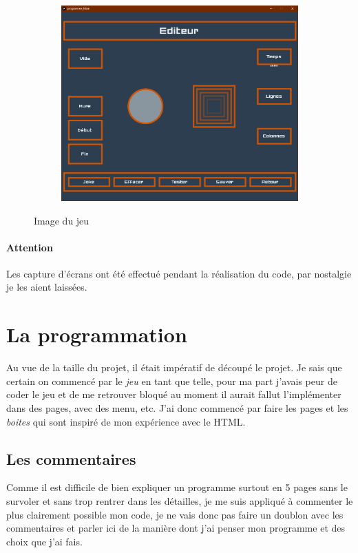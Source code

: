 \documentclass[10pt,a4paper]{article}
\begin{document}
\begin{figure}[h!]
\begin{subfigure}{.24\textwidth}
\end{subfigure} 
\begin{subfigure}{.24\textwidth}
	\centering
	\includegraphics[width=.9\linewidth]{Capture4.PNG}
\end{subfigure}
\label{fig10}
\caption{Image du jeu}
\end{figure}
\paragraph{Attention}Les capture d'écrans ont été effectué pendant la réalisation du code, par nostalgie je les aient laissées. 
\section{La programmation}
Au vue de la taille du projet, il était impératif de découpé le projet. Je sais que certain on commencé par le \textit{jeu} en tant que telle, pour ma part j'avais peur de coder le jeu et de me retrouver bloqué au moment il aurait fallut l'implémenter dans des pages, avec des menu, etc. J'ai donc commencé par faire les pages et les \textit{boites} qui sont inspiré de mon expérience avec le HTML. 
\subsection{Les commentaires} Comme il est difficile de bien expliquer un programme surtout en 5 pages sans le survoler et sans trop rentrer dans les détailles, je me suis appliqué à commenter le plus clairement possible mon code, je ne vais donc pas faire un doublon avec les commentaires et parler ici de la manière dont j'ai penser mon programme et des choix que j'ai fais. 
\end{document}
